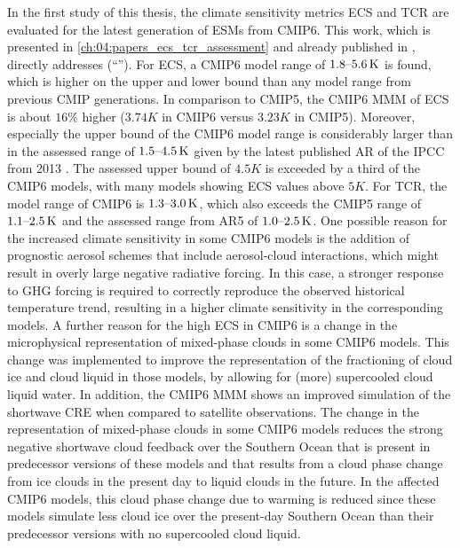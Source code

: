 In the first study of this thesis, the climate sensitivity metrics \ac{ECS} and
\ac{TCR} are evaluated for the latest generation of \acp{ESM} from \acs{CMIP}6.
This work, which is presented in \cref{ch:04:papers_ecs_tcr_assessment} and
already published in \textcite{Bock2020, Meehl2020}, directly addresses
 (\enquote{\KeyScienceQuestionOne{}}). For \ac{ECS}, a
\acs{CMIP}6 model range of $\rangeunit{1.8}{5.6}{K}$ is found, which is higher
on the upper and lower bound than any model range from previous \ac{CMIP}
generations. In comparison to \acs{CMIP}5, the \acs{CMIP}6 \ac{MMM} of \ac{ECS}
is about $16 \unit{\%}$ higher ($3.74 \unit{K}$ in \acs{CMIP}6 versus $3.23
\unit{K}$ in \acs{CMIP}5). Moreover, especially the upper bound of the
\acs{CMIP}6 model range is considerably larger than in the assessed range of
$\rangeunit{1.5}{4.5}{K}$ given by the latest published \ac{AR} of the
\ac{IPCC} from 2013 \autocite{Stocker2013}. The assessed upper bound of $4.5
\unit{K}$ is exceeded by a third of the \acs{CMIP}6 models, with many models
showing \ac{ECS} values above $5 \unit{K}$. For \ac{TCR}, the model range of
\acs{CMIP}6 is $\rangeunit{1.3}{3.0}{K}$, which also exceeds the \acs{CMIP}5
range of $\rangeunit{1.1}{2.5}{K}$ and the assessed range from \acs{AR}5 of
$\rangeunit{1.0}{2.5}{K}$. One possible reason for the increased climate
sensitivity in some \acs{CMIP}6 models is the addition of prognostic aerosol
schemes that include aerosol-cloud interactions, which might result in overly
large negative radiative forcing. In this case, a stronger response to \ac{GHG}
forcing is required to correctly reproduce the observed historical temperature
trend, resulting in a higher climate sensitivity in the corresponding models. A
further reason for the high \ac{ECS} in \acs{CMIP}6 is a change in the
microphysical representation of mixed-phase clouds in some \acs{CMIP}6 models.
This change was implemented to improve the representation of the fractioning of
cloud ice and cloud liquid in those models, \eg{} by allowing for (more)
supercooled cloud liquid water. In addition, the \acs{CMIP}6 \ac{MMM} shows an
improved simulation of the shortwave \ac{CRE} when compared to satellite
observations. The change in the representation of mixed-phase clouds in some
\acs{CMIP}6 models reduces the strong negative shortwave cloud feedback over
the Southern Ocean that is present in predecessor versions of these models and
that results from a cloud phase change from ice clouds in the present day to
liquid clouds in the future. In the affected \acs{CMIP}6 models, this cloud
phase change due to warming is reduced since these models simulate less cloud
ice over the present-day Southern Ocean than their predecessor versions with no
supercooled cloud liquid.

